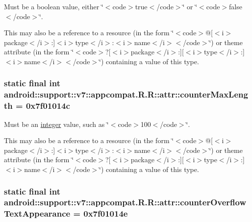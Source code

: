 Must be a boolean value, either \char`\"{}$<$code$>$true$<$/code$>$\char`\"{} or \char`\"{}$<$code$>$false$<$/code$>$\char`\"{}. 

This may also be a reference to a resource (in the form \char`\"{}$<$code$>$@\mbox{[}$<$i$>$package$<$/i$>$:\mbox{]}$<$i$>$type$<$/i$>$:$<$i$>$name$<$/i$>$$<$/code$>$\char`\"{}) or theme attribute (in the form \char`\"{}$<$code$>$?\mbox{[}$<$i$>$package$<$/i$>$:\mbox{]}\mbox{[}$<$i$>$type$<$/i$>$:\mbox{]}$<$i$>$name$<$/i$>$$<$/code$>$\char`\"{}) containing a value of this type. \hypertarget{classandroid_1_1support_1_1v7_1_1appcompat_1_1_r_1_1attr_b65c829ee7a1b2ab0e6fb5b5c5a8e718}{
\subsubsection[{counterMaxLength}]{\setlength{\rightskip}{0pt plus 5cm}static final int android::support::v7::appcompat.R.R::attr::counterMaxLength = 0x7f01014c}}
\label{classandroid_1_1support_1_1v7_1_1appcompat_1_1_r_1_1attr_b65c829ee7a1b2ab0e6fb5b5c5a8e718}


Must be an \hyperlink{classandroid_1_1support_1_1v7_1_1appcompat_1_1_r_1_1integer}{integer} value, such as \char`\"{}$<$code$>$100$<$/code$>$\char`\"{}. 

This may also be a reference to a resource (in the form \char`\"{}$<$code$>$@\mbox{[}$<$i$>$package$<$/i$>$:\mbox{]}$<$i$>$type$<$/i$>$:$<$i$>$name$<$/i$>$$<$/code$>$\char`\"{}) or theme attribute (in the form \char`\"{}$<$code$>$?\mbox{[}$<$i$>$package$<$/i$>$:\mbox{]}\mbox{[}$<$i$>$type$<$/i$>$:\mbox{]}$<$i$>$name$<$/i$>$$<$/code$>$\char`\"{}) containing a value of this type. \hypertarget{classandroid_1_1support_1_1v7_1_1appcompat_1_1_r_1_1attr_430bf56865694a4e5c5e57b4f3d0655f}{
\subsubsection[{counterOverflowTextAppearance}]{\setlength{\rightskip}{0pt plus 5cm}static final int android::support::v7::appcompat.R.R::attr::counterOverflowTextAppearance = 0x7f01014e}}
\label{classandroid_1_1support_1_1v7_1_1appcompat_1_1_r_1_1attr_430bf56865694a4e5c5e57b4f3d0655f}


